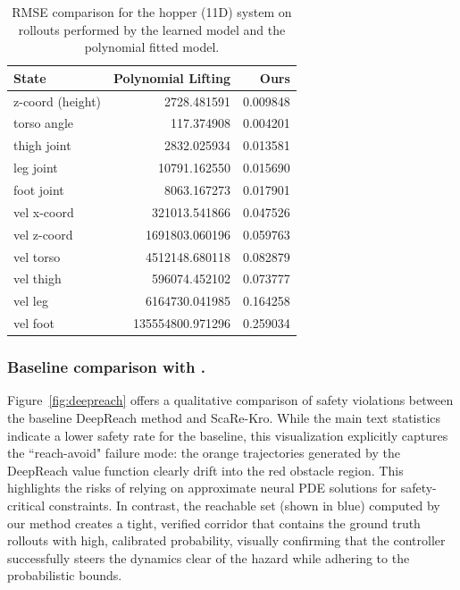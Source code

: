 \begin{table}[ht]
\centering
\begin{tabular}{lrr}
\hline
\textbf{State} & \textbf{Polynomial Lifting} & \textbf{Ours} \\
\hline
z-coord (height)   & 2728.481591        & 0.009848 \\
torso angle        & 117.374908         & 0.004201 \\
thigh joint        & 2832.025934        & 0.013581 \\
leg joint          & 10791.162550       & 0.015690 \\
foot joint         & 8063.167273        & 0.017901 \\
vel x-coord        & 321013.541866      & 0.047526 \\
vel z-coord        & 1691803.060196     & 0.059763 \\
vel torso          & 4512148.680118     & 0.082879 \\
vel thigh          & 596074.452102      & 0.073777 \\
vel leg            & 6164730.041985     & 0.164258 \\
vel foot           & 135554800.971296   & 0.259034 \\
\hline
\end{tabular}
\caption{RMSE comparison for the hopper (11D) system on rollouts performed by the learned model and the polynomial fitted model.}
\label{tab:hopper_11d_rmse}
\end{table}

\subsubsection{Baseline comparison with \cite{deepreach}.}\label{app:deepreach}

Figure~\ref{fig:deepreach} offers a qualitative comparison of safety violations between the baseline DeepReach method \citep{deepreach} and ScaRe-Kro. While the main text statistics indicate a lower safety rate for the baseline, this visualization explicitly captures the ``reach-avoid" failure mode: the orange trajectories generated by the DeepReach value function clearly drift into the red obstacle region. This highlights the risks of relying on approximate neural PDE solutions for safety-critical constraints. In contrast, the reachable set (shown in blue) computed by our method creates a tight, verified corridor that contains the ground truth rollouts with high, calibrated probability, visually confirming that the controller successfully steers the dynamics clear of the hazard while adhering to the probabilistic bounds.

